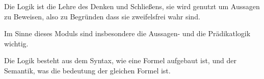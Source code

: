 \documentclass{article}
\begin{document}
Die Logik ist die Lehre des Denken und Schließens, sie wird genutzt um Aussagen zu Beweisen, also zu Begründen dass sie zweifelsfrei wahr sind.

Im Sinne dieses Moduls sind insbesondere die Aussagen- und die Prädikatlogik wichtig.

Die Logik besteht aus dem Syntax, wie eine Formel aufgebaut ist, und der Semantik, was die bedeutung der gleichen Formel ist.
\end{document}
